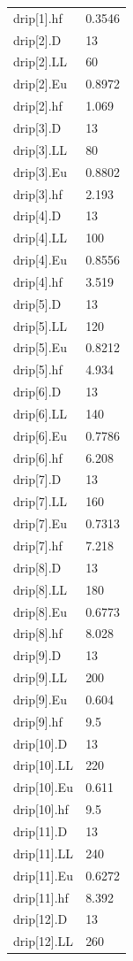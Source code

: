 {\begin{longtable}{p{}p{}}
{}drip[1].hf & 0.3546\\
{}drip[2].D & 13\\
{}drip[2].LL & 60\\
{}drip[2].Eu & 0.8972\\
{}drip[2].hf & 1.069\\
{}drip[3].D & 13\\
{}drip[3].LL & 80\\
{}drip[3].Eu & 0.8802\\
{}drip[3].hf & 2.193\\
{}drip[4].D & 13\\
{}drip[4].LL & 100\\
{}drip[4].Eu & 0.8556\\
{}drip[4].hf & 3.519\\
{}drip[5].D & 13\\
{}drip[5].LL & 120\\
{}drip[5].Eu & 0.8212\\
{}drip[5].hf & 4.934\\
{}drip[6].D & 13\\
{}drip[6].LL & 140\\
{}drip[6].Eu & 0.7786\\
{}drip[6].hf & 6.208\\
{}drip[7].D & 13\\
{}drip[7].LL & 160\\
{}drip[7].Eu & 0.7313\\
{}drip[7].hf & 7.218\\
{}drip[8].D & 13\\
{}drip[8].LL & 180\\
{}drip[8].Eu & 0.6773\\
{}drip[8].hf & 8.028\\
{}drip[9].D & 13\\
{}drip[9].LL & 200\\
{}drip[9].Eu & 0.604\\
{}drip[9].hf & 9.5\\
{}drip[10].D & 13\\
{}drip[10].LL & 220\\
{}drip[10].Eu & 0.611\\
{}drip[10].hf & 9.5\\
{}drip[11].D & 13\\
{}drip[11].LL & 240\\
{}drip[11].Eu & 0.6272\\
{}drip[11].hf & 8.392\\
{}drip[12].D & 13\\
{}drip[12].LL & 260\\

\end{longtable}}
